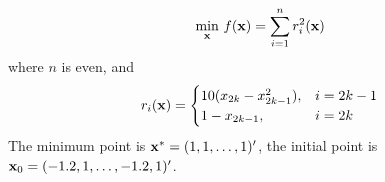\begin{example}
	\begin{equation}
		\min_{{\bf x}}\,f({\bf x})=\sum_{i=1}^{n}r_{i}^{2}({\bf x})
	\end{equation}
	where $n$ is even, and
	\begin{equation}
		r_{i}({\bf x})=\begin{cases}
			10(x_{2k}-x_{2k-1}^{2}), & i=2k-1 \\
			1-x_{2k-1},              & i=2k   \\
		\end{cases}
	\end{equation}
	The minimum point is ${\bf x}^{*}=(1,1,\ldots,1)^{\prime}$, the initial point is ${\bf x}_{0}=(-1.2,1,\ldots,-1.2,1)^{\prime}$.
\end{example}
